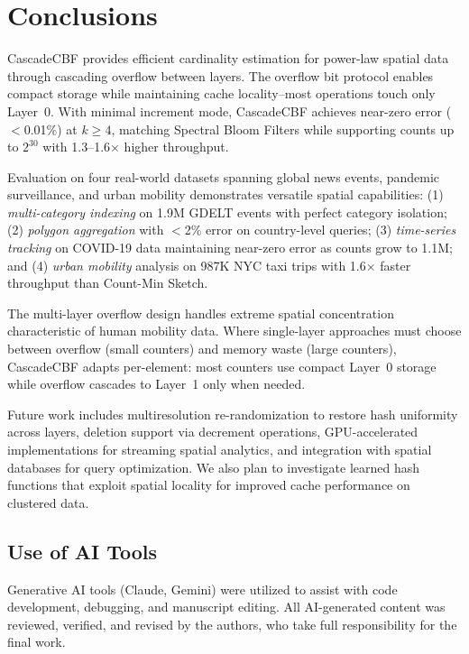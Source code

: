 \documentclass[agile, final]{copernicus-agile}
\begin{document}
\section{Conclusions}
\label{sec:conclusions}

CascadeCBF provides efficient cardinality estimation for power-law spatial data through cascading overflow between layers. The overflow bit protocol enables compact storage while maintaining cache locality--most operations touch only Layer~0. With minimal increment mode, CascadeCBF achieves near-zero error ($<$0.01\%) at $k \geq 4$, matching Spectral Bloom Filters while supporting counts up to $2^{30}$ with 1.3--1.6$\times$ higher throughput.

Evaluation on four real-world datasets spanning global news events, pandemic surveillance, and urban mobility demonstrates versatile spatial capabilities: (1) \emph{multi-category indexing} on 1.9M GDELT events with perfect category isolation; (2) \emph{polygon aggregation} with $<$2\% error on country-level queries; (3) \emph{time-series tracking} on COVID-19 data maintaining near-zero error as counts grow to 1.1M; and (4) \emph{urban mobility} analysis on 987K NYC taxi trips with 1.6$\times$ faster throughput than Count-Min Sketch.

The multi-layer overflow design handles extreme spatial concentration characteristic of human mobility data. Where single-layer approaches must choose between overflow (small counters) and memory waste (large counters), CascadeCBF adapts per-element: most counters use compact Layer~0 storage while overflow cascades to Layer~1 only when needed.

Future work includes multiresolution re-randomization to restore hash uniformity across layers, deletion support via decrement operations, GPU-accelerated implementations for streaming spatial analytics, and integration with spatial databases for query optimization. We also plan to investigate learned hash functions that exploit spatial locality for improved cache performance on clustered data.


\subsection*{Use of AI Tools}

Generative AI tools (Claude, Gemini) were utilized to assist with code development, debugging, and manuscript editing. All AI-generated content was reviewed, verified, and revised by the authors, who take full responsibility for the final work.
\end{document}
